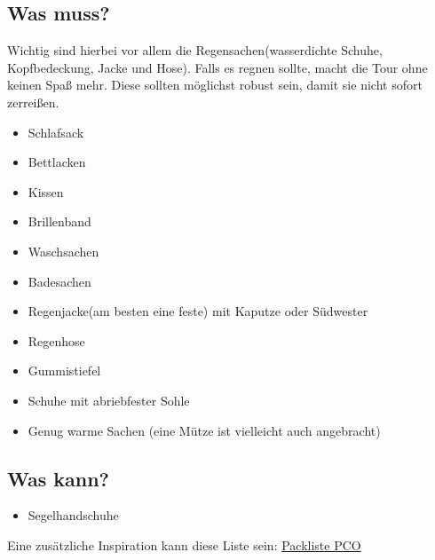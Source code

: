 \documentclass[12pt]{article}
\begin{document}
\subsection*{Was muss?}
Wichtig sind hierbei vor allem die Regensachen(wasserdichte Schuhe, Kopfbedeckung, Jacke und Hose). Falls es regnen sollte, macht die Tour ohne keinen Spaß mehr. Diese sollten möglichst robust sein, damit sie nicht sofort zerreißen.
\begin{itemize}
\renewcommand{\labelitemi}{$\boxempty$}
\item Schlafsack
\item Bettlacken
\item Kissen
\item Brillenband
\item Waschsachen
\item Badesachen
\item Regenjacke(am besten eine feste) mit Kaputze oder Südwester
\item Regenhose
\item Gummistiefel
\item Schuhe mit abriebfester Sohle
\item Genug warme Sachen (eine Mütze ist vielleicht auch angebracht)
\end{itemize}

\subsection*{Was kann?}
\begin{itemize}
\renewcommand{\labelitemi}{$\boxempty$}
\item Segelhandschuhe

\end{itemize}

Eine zusätzliche Inspiration kann diese Liste sein: \href{http://www.pc-ostsee.de/yachtcharter/sites/download/Packliste.pdf}{Packliste PCO}

\end{document}
